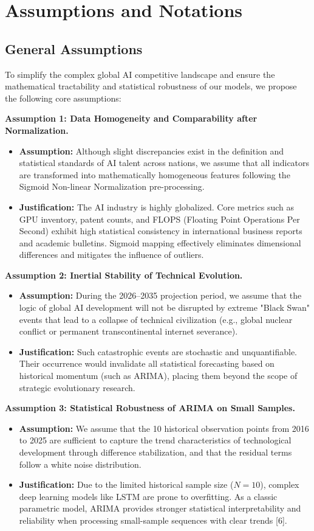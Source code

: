 \documentclass[12pt]{article}
\begin{document}
	\section{Assumptions and Notations}
	\subsection{General Assumptions}
	To simplify the complex global AI competitive landscape and ensure the mathematical tractability and statistical robustness of our models, we propose the following core assumptions:
	
	\textbf{Assumption 1: Data Homogeneity and Comparability after Normalization.}
	\begin{itemize}
		\item \textbf{Assumption:} Although slight discrepancies exist in the definition and statistical standards of AI talent across nations, we assume that all indicators are transformed into mathematically homogeneous features following the Sigmoid Non-linear Normalization pre-processing.
		\item \textbf{Justification:} The AI industry is highly globalized. Core metrics such as GPU inventory, patent counts, and FLOPS (Floating Point Operations Per Second) exhibit high statistical consistency in international business reports and academic bulletins. Sigmoid mapping effectively eliminates dimensional differences and mitigates the influence of outliers.
	\end{itemize}
	
	\textbf{Assumption 2: Inertial Stability of Technical Evolution.}
	\begin{itemize}
		\item \textbf{Assumption:} During the 2026–2035 projection period, we assume that the logic of global AI development will not be disrupted by extreme "Black Swan" events that lead to a collapse of technical civilization (e.g., global nuclear conflict or permanent transcontinental internet severance).
		\item \textbf{Justification:} Such catastrophic events are stochastic and unquantifiable. Their occurrence would invalidate all statistical forecasting based on historical momentum (such as ARIMA), placing them beyond the scope of strategic evolutionary research.
	\end{itemize}
	
	\textbf{Assumption 3: Statistical Robustness of ARIMA on Small Samples.}
	\begin{itemize}
		\item \textbf{Assumption:} We assume that the 10 historical observation points from 2016 to 2025 are sufficient to capture the trend characteristics of technological development through difference stabilization, and that the residual terms follow a white noise distribution.
		\item \textbf{Justification:} Due to the limited historical sample size ($N=10$), complex deep learning models like LSTM are prone to overfitting. As a classic parametric model, ARIMA provides stronger statistical interpretability and reliability when processing small-sample sequences with clear trends [6].
	\end{itemize}
	
\end{document}
